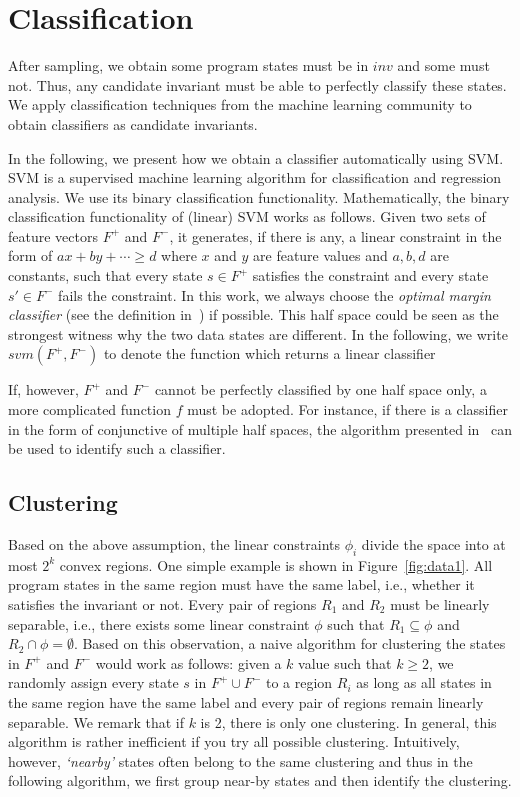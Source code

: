 
\section{Classification}
After sampling, we obtain some program states must be in $inv$ and some must not. Thus, any candidate invariant must be able to perfectly classify these states. We apply classification techniques from the machine learning community to obtain classifiers as candidate invariants.

In the following, we present how we obtain a classifier automatically using SVM. SVM is a supervised machine learning algorithm for classification and regression analysis. We use its binary classification functionality. Mathematically, the binary classification functionality of (linear) SVM works as follows. Given two sets of feature vectors $F^+$ and $F^-$, it generates, if there is any, a linear constraint in the form of $ax + by + \cdots \geq d$ where $x$ and $y$ are feature values and $a, b, d$ are constants, such that every state $s \in F^+$ satisfies the constraint and every state $s' \in F^-$ fails the constraint. In this work, we always choose the \textit{optimal margin classifier} (see the definition in~\cite{Sharma2012}) if possible. This half space could be seen as the strongest witness why the two data states are different. In the following, we write $svm(F^+, F^-)$ to denote the function which returns a linear classifier

If, however, $F^+$ and $F^-$ cannot be perfectly classified by one half space only, a more complicated function $f$ must be adopted. For instance, if there is a classifier in the form of conjunctive of multiple half spaces, the algorithm presented in~\cite{Sharma2012} can be used to identify such a classifier.

\subsection{Clustering}
Based on the above assumption, the linear constraints $\phi_i$ 
divide the space into at most $2^k$ convex regions. 
One simple example is shown in Figure~\ref{fig:data1}. 
All program states in the same region must have the same label, 
i.e., whether it satisfies the invariant or not. 
Every pair of regions $R_1$ and $R_2$ must be linearly separable, 
i.e., there exists some linear constraint $\phi$ 
such that $R_1 \subseteq \phi$ and $R_2 \cap \phi = \emptyset$. 
Based on this observation, a naive algorithm for clustering the states 
in $F^+$ and $F^-$ would work as follows: given a $k$ value such that $k \geq 2$, 
we randomly assign every state $s$ in $F^+ \cup F^-$ to a region $R_i$ 
as long as all states in the same region have the same label 
and every pair of regions remain linearly separable. 
We remark that if $k$ is 2, there is only one clustering. 
In general, this algorithm is rather inefficient if you try all possible clustering. 
Intuitively, however, \emph{`nearby'} states often belong to the same clustering 
and thus in the following algorithm, 
we first group near-by states and then identify the clustering.

